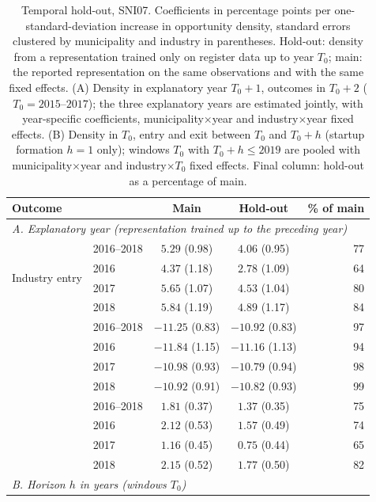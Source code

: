 \documentclass[9pt,twoside]{pnas-new}
\begin{document}
\begin{table}[H]
\centering
\small
\setlength{\tabcolsep}{4pt}
\caption{Temporal hold-out, SNI07. Coefficients in percentage points per one-standard-deviation increase in opportunity density, standard errors clustered by municipality and industry in parentheses. Hold-out: density from a representation trained only on register data up to year $T_0$; main: the reported representation on the same observations and with the same fixed effects. (A) Density in explanatory year $T_0+1$, outcomes in $T_0+2$ ($T_0=2015$--$2017$); the three explanatory years are estimated jointly, with year-specific coefficients, municipality$\times$year and industry$\times$year fixed effects. (B) Density in $T_0$, entry and exit between $T_0$ and $T_0+h$ (startup formation $h=1$ only); windows $T_0$ with $T_0+h\le2019$ are pooled with municipality$\times$year and industry$\times T_0$ fixed effects. Final column: hold-out as a percentage of main.}
\label{tab:holdout-temporal}
\begin{tabular}{llccr}
\toprule
Outcome & & Main & Hold-out & \% of main \\
\midrule
\multicolumn{5}{l}{\textit{A. Explanatory year (representation trained up to the preceding year)}} \\
\multirow{4}{*}{Industry entry} & 2016--2018 & $5.29$ (0.98) & $4.06$ (0.95) & 77 \\
 & 2016 & $4.37$ (1.18) & $2.78$ (1.09) & 64 \\
 & 2017 & $5.65$ (1.07) & $4.53$ (1.04) & 80 \\
 & 2018 & $5.84$ (1.19) & $4.89$ (1.17) & 84 \\
\addlinespace
\multirow{4}{*}{Industry exit} & 2016--2018 & $-11.25$ (0.83) & $-10.92$ (0.83) & 97 \\
 & 2016 & $-11.84$ (1.15) & $-11.16$ (1.13) & 94 \\
 & 2017 & $-10.98$ (0.93) & $-10.79$ (0.94) & 98 \\
 & 2018 & $-10.92$ (0.91) & $-10.82$ (0.93) & 99 \\
\addlinespace
\multirow{4}{*}{Startup formation} & 2016--2018 & $1.81$ (0.37) & $1.37$ (0.35) & 75 \\
 & 2016 & $2.12$ (0.53) & $1.57$ (0.49) & 74 \\
 & 2017 & $1.16$ (0.45) & $0.75$ (0.44) & 65 \\
 & 2018 & $2.15$ (0.52) & $1.77$ (0.50) & 82 \\
\midrule
\multicolumn{5}{l}{\textit{B. Horizon $h$ in years (windows $T_0$)}} \\

\end{tabular}
\end{table}
\end{document}
